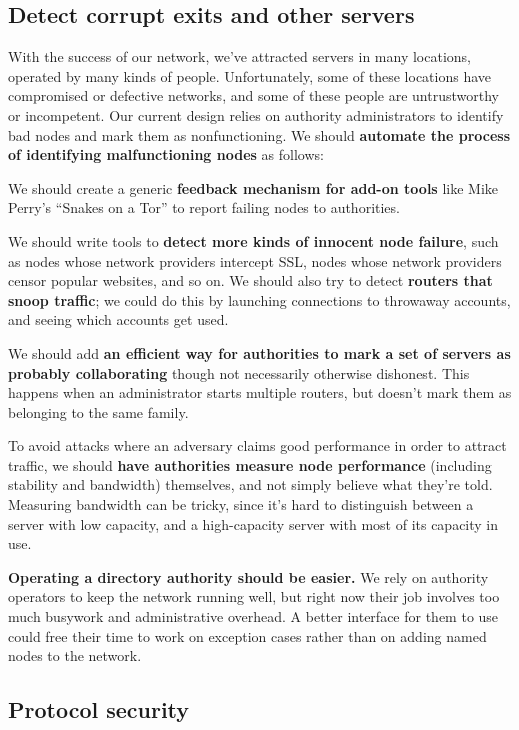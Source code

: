 \documentclass{article}
\begin{document}
\subsection{Detect corrupt exits and other servers}
With the success of our network, we've attracted servers in many locations,
operated by many kinds of people.  Unfortunately, some of these locations
have compromised or defective networks, and some of these people are
untrustworthy or incompetent.  Our current design relies on authority
administrators to identify bad nodes and mark them as nonfunctioning.  We
should {\bf automate the process of identifying malfunctioning nodes} as
follows:

We should create a generic {\bf feedback mechanism for add-on tools} like
Mike Perry's ``Snakes on a Tor'' to report failing nodes to authorities.

We should write tools to {\bf detect more kinds of innocent node failure},
such as nodes whose network providers intercept SSL, nodes whose network
providers censor popular websites, and so on.  We should also try to detect
{\bf routers that snoop traffic}; we could do this by launching connections
to throwaway accounts, and seeing which accounts get used.

We should add {\bf an efficient way for authorities to mark a set of servers
  as probably collaborating} though not necessarily otherwise dishonest.
This happens when an administrator starts multiple routers, but doesn't mark
them as belonging to the same family.

To avoid attacks where an adversary claims good performance in order to
attract traffic, we should {\bf have authorities measure node performance}
(including stability and bandwidth) themselves, and not simply believe what
they're told.  Measuring bandwidth can be tricky, since it's hard to
distinguish between a server with low capacity, and a high-capacity server
with most of its capacity in use.

{\bf Operating a directory authority should be easier.}  We rely on authority
operators to keep the network running well, but right now their job involves
too much busywork and administrative overhead.  A better interface for them
to use could free their time to work on exception cases rather than on
adding named nodes to the network.

\subsection{Protocol security}
\end{document}
